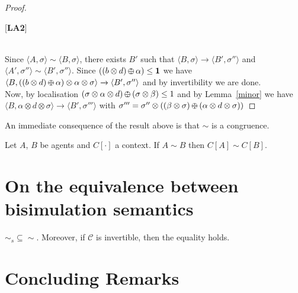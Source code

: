 \documentclass{llncs}
\def\monid{{\mathbf 0}}
\def\odiv{\, {\ominus\hspace{-7.7pt} \div} \,}
\def\monid{\mathbf{1}}
\begin{document}
\begin{proof}
\begin{description}
\item{[{\bf LA2}]}

\end{description}
\\  


  Since $\langle A,\sigma \rangle \sim \langle B,\sigma \rangle$, 
  there exists $B'$ such that 
  $\langle B, \sigma \rangle \xrightarrow{} \langle B', \sigma'' \rangle$
  and $\langle A', \sigma'' \rangle \sim \langle B', \sigma'' \rangle$.
  Since $((b \otimes d) \odiv \alpha) \leq \monid$ we have 
  $\langle B, ((b \otimes d) \odiv \alpha) \otimes \alpha \otimes \sigma \rangle \xrightarrow{} \langle B', \sigma'' \rangle$
  and by invertibility we are done.
  \\
  
  Now, by localisation $(\sigma \otimes \alpha \otimes d) \odiv (\sigma \otimes \beta) \leq 1$ 
  and by Lemma~\ref{minor}
  we have 
  $\langle B, \alpha \otimes d \otimes \sigma \rangle 
  \xrightarrow{} \langle B', \sigma''' \rangle$
  with 
  $\sigma''' = \sigma'' \otimes ((\beta \otimes \sigma) \odiv (\alpha \otimes d \otimes \sigma))$
\end{proof}

An immediate consequence of the result above is that $\sim$ is a congruence.

\begin{proposition}
Let $A$, $B$ be agents and $C[\cdot]$ a context.
If $A \sim B$
then $C[A] \sim C[B]$.
\end{proposition}

\section{On the equivalence between bisimulation semantics}

\begin{theorem}
$\sim_{\mathit{s}} \subseteq \sim$. Moreover, if $\mathcal{C}$ is invertible, then the equality holds.
\end{theorem}



\section{Concluding Remarks}\label{sec:conclusion}


\end{document}
